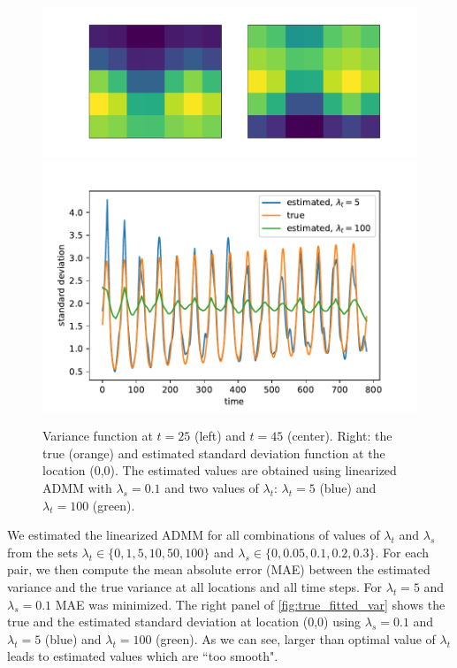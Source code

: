\documentclass{article}
\begin{document}
\begin{figure}[tb]
  \centering	
  \includegraphics[height=.15\textheight]{Figures/true_var_spatial}
  \includegraphics[height=.15\textheight]{Figures/true_fitted_var}
  \caption{Variance function at $t=25$ (left) and $t=45$
    (center). Right: the true (orange) and estimated standard deviation 
    function at the location (0,0). The estimated values are
    obtained using linearized ADMM with $\lambda_s=0.1$ and two
    values of $\lambda_t$: $\lambda_t=5$ (blue) and
    $\lambda_t=100$ (green).} \label{fig:true_var_spatial}
\end{figure}

We estimated the linearized ADMM for all combinations of values of
$\lambda_t$ and $\lambda_s$ from the sets $\lambda_t \in
\{0,1,5,10,50,100\}$ and $\lambda_s \in \{0,0.05,0.1,0.2,0.3\}$. For
each pair, we then compute the mean absolute error (MAE) between the
estimated variance and the true variance at all locations and all time
steps. For $\lambda_t=5$ and $\lambda_s=0.1$ MAE was minimized. The
right panel of \autoref{fig:true_fitted_var} shows the true and the
estimated standard deviation at location (0,0) using $\lambda_s=0.1$
and $\lambda_t=5$ (blue) and $\lambda_t=100$ (green). As we can see,
larger than optimal value of $\lambda_t$ leads to estimated values
which are ``too smooth".  
\end{document}
